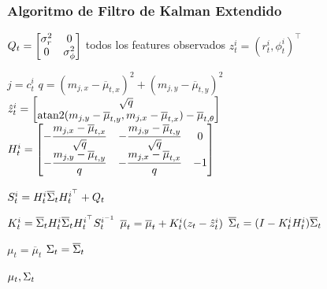 \begin{frame}
    \frametitle{Algoritmo de Filtro de Kalman Extendido}
    \footnotesize
     \begin{algorithmic}[1]
        \State
        $ Q_{t} =
            \begin{bmatrix}
                \sigma_{r}^{2} & 0\\
                0 & \sigma_{\phi}^{2}
            \end{bmatrix}
        $
        \For todos los features observados $z_{t}^{i} = (r_{t}^{i}, \phi_{t}^{i})^{\top}$
        
        \State $ j = c_{t}^{i}$
        \State $ q = (m_{j,x}-\overline{\mu}_{t,x})^{2} + (m_{j,y}-\overline{\mu}_{t,y})^{2} $
        \State
        $ \hat{z}_{t}^{i} =
            \begin{bmatrix}
                \sqrt{q}\\
                \operatorname{atan2}(m_{j,y}-\overline{\mu}_{t,y}, m_{j,x}-\overline{\mu}_{t,x}) - \overline{\mu}_{t,\theta}
            \end{bmatrix}
        $
        \State
        $ H_{t}^{i} = 
            \begin{bmatrix}
                -\dfrac{m_{j,x} - \overline{\mu}_{t,x}}{\sqrt{q}} & -\dfrac{m_{j,y} - \overline{\mu}_{t,y}}{\sqrt{q}}  & 0\\
                -\dfrac{m_{j,y} - \overline{\mu}_{t,y}}{q}  & -\dfrac{m_{j,x} - \overline{\mu}_{t,x}}{q}  & -1
            \end{bmatrix}
        $
        
        \State $S_{t}^{i} = H_{t}^{i} \overline{\Sigma}_{t} H_{t}^{i^{\top}} + Q_{t} $

        \State $K_{t}^{i} = \overline{\Sigma}_{t} {H_{t}^{i}} \overline{\Sigma}_{t} H_{t}^{i^{\top}} S_{t}^{i^{-1}} $
        \State $\overline{\mu}_{t} = \overline{\mu}_{t} + K_{t}^{i}(z_{t} - \hat{z}_{t}^{i})$
        \State $\overline{\Sigma}_{t} = (I - K_{t}^{i}H_{t}^{i})\overline{\Sigma}_{t}$
        
        \EndFor
        \State $\mu_{t} = \overline{\mu}_{t}$
        \State $\Sigma_{t} = \overline{\Sigma}_{t}$
        
        \State \Return $\mu_{t}, \Sigma_{t}$
    \end{algorithmic}
    
    
\end{frame}

